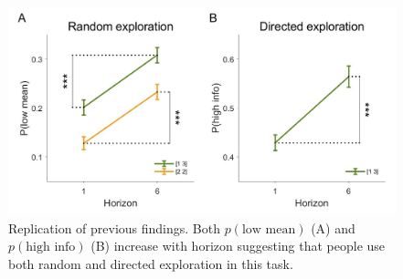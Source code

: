 \documentclass[12pt]{article}
\begin{document}
{	


\begin{figure}[H]
	\begin{center}
		\includegraphics[width=\textwidth]{figures/RanDetNoise_modelfree.jpg}
		\caption{
			Replication of previous findings. Both  $p(\mbox{low mean})$ (A) and $p(\mbox{high info})$ (B) increase with horizon suggesting that people use both random and directed exploration in this task.  }
		\label{fig:modelfree}
	\end{center}
\end{figure}

}
\end{document}
